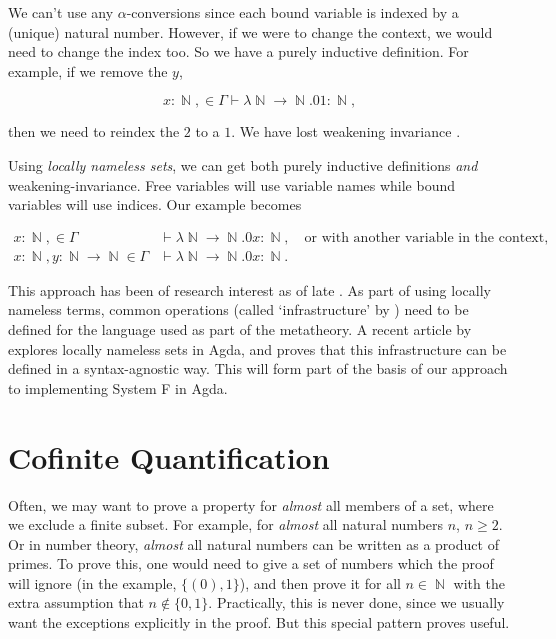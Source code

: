 \documentclass[logo,bsc,singlespacing,parskip,online]{infthesis}
\DeclareMathOperator{\nat}{\mathbb{N}}
\begin{document}
We can't use any $\alpha$-conversions since each bound variable is indexed by a
(unique) natural number. However, if we were to change the context, we would
need to change the index too. So we have a purely inductive definition. For
example, if we remove the $y$,

\begin{equation*}
  x \colon \nat, \in \Gamma \vdash \lambda \nat \to \nat. 0 1 \colon \nat,
\end{equation*}

then we need to reindex the $2$ to a $1$. We have lost weakening invariance
\citep{aydemir_engineering_2008}.

Using \textit{locally nameless sets}, we can get both purely inductive
definitions \textit{and} weakening-invariance. Free variables will use variable
names while bound variables will use indices. Our example becomes

\begin{align*}
  x \colon \nat, \in \Gamma &\vdash \lambda \nat \to \nat. 0 x \colon \nat,\quad \text{or with another variable in the context,}\\
  x \colon \nat, y \colon \nat \to \nat \in \Gamma &\vdash \lambda \nat \to \nat. 0 x \colon \nat.
\end{align*}

This approach has been of research interest as of late \citep{aydemir_engineering_2008}
\citep{chargueraud_locally_2012}. As part of using locally nameless terms, common operations (called
`infrastructure' by ) need to be defined for the language used as part of the metatheory. A recent
article by explores locally nameless sets in Agda, and proves that this infrastructure can be
defined in a syntax-agnostic way. This will form part of the basis of our approach to implementing
System F in Agda.

\section{Cofinite Quantification}

Often, we may want to prove a property for \textit{almost} all members of a set, where we exclude a
finite subset. For example, for \textit{almost} all natural numbers $n$, $n \geq 2$. Or in number
theory, \textit{almost} all natural numbers can be written as a product of primes. To prove this,
one would need to give a set of numbers which the proof will ignore (in the example, $\{ (0), 1
\}$), and then prove it for all $n \in \nat$ with the extra assumption that $n \not \in \{0, 1\}$.
Practically, this is never done, since we usually want the exceptions explicitly in the proof. But
this special pattern proves useful.
\end{document}
